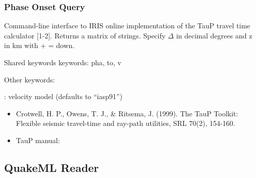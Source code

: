 \documentclass[letterpaper,11pt,english]{sphinxmanual}
\begin{document}
\subsubsection{Phase Onset Query}
\label{\detokenize{src/Submodules/quake:phase-onset-query}}

\begin{fulllineitems}
\label{\detokenize{src/Submodules/quake:get_pha}}
\end{fulllineitems}


Command-line interface to IRIS online implementation of the TauP travel time
calculator {[}1-2{]}. Returns a matrix of strings. Specify \(\Delta\) in decimal degrees
and z in km with + = down.

\begin{DUlineblock}{0em}
\item[] Shared keywords keywords: pha, to, v
\item[] Other keywords:
\item[] : velocity model (defaults to “iasp91”)
\end{DUlineblock}

\begin{itemize}
\item {} 
Crotwell, H. P., Owens, T. J., \& Ritsema, J. (1999). The TauP Toolkit: Flexible seismic travel-time and ray-path utilities, SRL 70(2), 154-160.

\item {} 
TauP manual: 

\end{itemize}


\subsection{QuakeML Reader}
\label{\detokenize{src/Submodules/quake:quakeml-reader}}

\begin{fulllineitems}
\label{\detokenize{src/Submodules/quake:read_qml}}
\end{fulllineitems}
\end{document}
